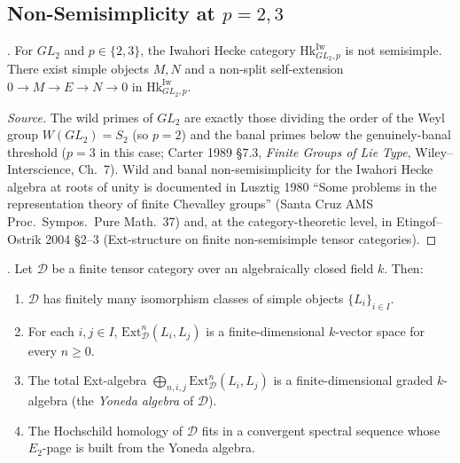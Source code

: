 \subsection{Non-Semisimplicity at \(p=2,3\)}

\begin{proposition}
\label{v4-arith:bzn-rcompletion:prop:non-ss-wild}
\ClaimStatusProvedElsewhere. For \(GL_{2}\) and \(p\in\{2,3\}\), the
Iwahori Hecke category \(\mathrm{Hk}^{\mathrm{Iw}}_{GL_{2},p}\) is
not semisimple. There exist simple objects \(M,N\) and a non-split
self-extension
\(0\to M\to E\to N\to 0\) in \(\mathrm{Hk}^{\mathrm{Iw}}_{GL_{2},p}\).
\end{proposition}

\begin{proof}[Source]
The wild primes of \(GL_{2}\) are exactly those dividing the order
of the Weyl group \(W(GL_{2})=S_{2}\) (so \(p=2\)) and the banal
primes below the genuinely-banal threshold (\(p=3\) in this case;
Carter 1989 \S 7.3, \emph{Finite Groups of Lie Type},
Wiley--Interscience, Ch.~7). Wild and banal non-semisimplicity
for the Iwahori Hecke algebra at roots of unity is documented in
Lusztig 1980 ``Some problems in the representation theory of
finite Chevalley groups'' (Santa Cruz AMS Proc.~Sympos.~Pure
Math.~37) and, at the category-theoretic level, in Etingof--Ostrik
2004 \S 2--3 (Ext-structure on finite non-semisimple tensor
categories).
\end{proof}

\begin{lemma}
\label{v4-arith:bzn-rcompletion:lem:EO-ext}
\ClaimStatusProvedElsewhere. Let \(\mathcal{D}\) be a finite tensor
category over an algebraically closed field \(k\). Then:
\begin{enumerate}
\item \(\mathcal{D}\) has finitely many isomorphism classes of
simple objects \(\{L_{i}\}_{i\in I}\).
\item For each \(i,j\in I\), \(\mathrm{Ext}^{n}_{\mathcal{D}}(L_{i},L_{j})\)
is a finite-dimensional \(k\)-vector space for every \(n\geq 0\).
\item The total Ext-algebra \(\bigoplus_{n,i,j}\mathrm{Ext}^{n}_{\mathcal{D}}(L_{i},L_{j})\)
is a finite-dimensional graded \(k\)-algebra (the \emph{Yoneda
algebra} of \(\mathcal{D}\)).
\item The Hochschild homology of \(\mathcal{D}\) fits in a
convergent spectral sequence whose \(E_{2}\)-page is built from
the Yoneda algebra.
\end{enumerate}
\end{lemma}

